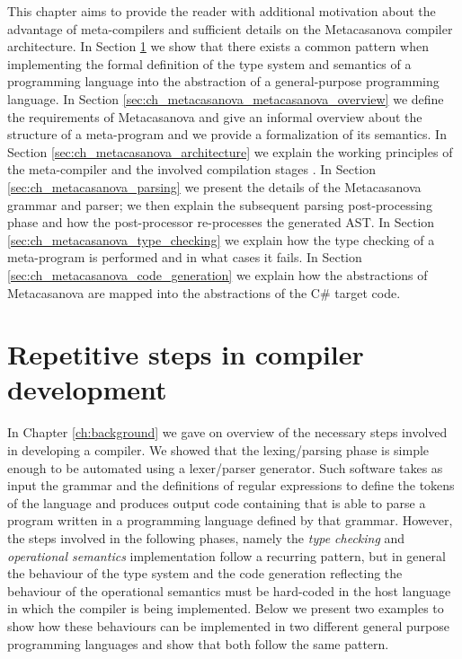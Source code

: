This chapter aims to provide the reader with additional motivation about the advantage of meta-compilers and sufficient details on the Metacasanova compiler architecture. In Section \ref{sec:ch_metacasanova_intro} we show that there exists a common pattern when implementing the formal definition of the type system and semantics of a programming language into the abstraction of a general-purpose programming language. In Section \ref{sec:ch_metacasanova_metacasanova_overview} we define the requirements of Metacasanova and give an informal overview about the structure of a meta-program and we provide a formalization of its semantics. In Section \ref{sec:ch_metacasanova_architecture} we explain the working principles of the meta-compiler and the involved compilation stages . In Section \ref{sec:ch_metacasanova_parsing} we present the details of the Metacasanova grammar and parser; we then explain the subsequent parsing post-processing phase and how the post-processor re-processes the generated AST. In Section \ref{sec:ch_metacasanova_type_checking} we explain how the type checking of a meta-program is performed and in what cases it fails. In Section \ref{sec:ch_metacasanova_code_generation} we explain how the abstractions of Metacasanova are mapped into the abstractions of the C\# target code.


\section{Repetitive steps in compiler development}
\label{sec:ch_metacasanova_intro}
In Chapter \ref{ch:background} we gave on overview of the necessary steps involved in developing a compiler. We showed that the lexing/parsing phase is simple enough to be automated using a lexer/parser generator. Such software takes as input the grammar and the definitions of regular expressions to define the tokens of the language and produces output code containing that is able to parse a program written in a programming language defined by that grammar. However, the steps involved in the following phases, namely the \textit{type checking} and \textit{operational semantics} implementation follow a recurring pattern, but in general the behaviour of the type system and the code generation reflecting the behaviour of the operational semantics must be hard-coded in the host language in which the compiler is being implemented. Below we present two examples to show how these behaviours can be implemented in two different general purpose programming languages and show that both follow the same pattern.

